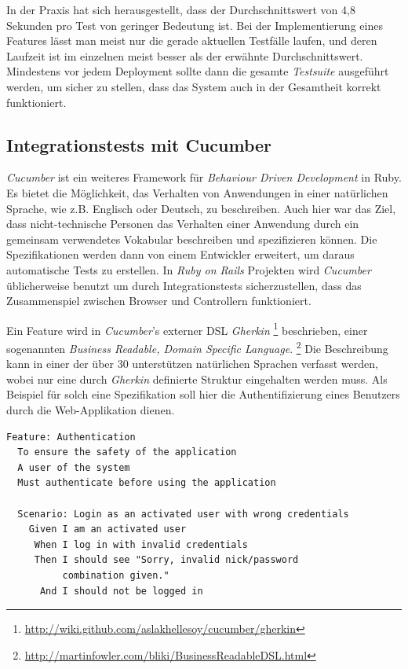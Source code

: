 In der Praxis hat sich herausgestellt, dass der Durchschnittswert von
4,8 Sekunden pro Test von geringer Bedeutung ist. Bei der
Implementierung eines Features lässt man meist nur die gerade
aktuellen Testfälle laufen, und deren Laufzeit ist im einzelnen meist
besser als der erwähnte Durchschnittswert. Mindestens vor jedem
Deployment sollte dann die gesamte \textit{Testsuite} ausgeführt werden, um
sicher zu stellen, dass das System auch in der Gesamtheit korrekt
funktioniert.

\subsection{Integrationstests mit Cucumber}
\textit{Cucumber} \cite{cucumber} ist ein weiteres Framework für
\textit{Behaviour Driven Development} in Ruby. Es bietet die
Möglichkeit, das Verhalten von Anwendungen in einer natürlichen
Sprache, wie z.B. Englisch oder Deutsch, zu beschreiben. Auch hier war
das Ziel, dass nicht-technische Personen das Verhalten einer Anwendung
durch ein gemeinsam verwendetes Vokabular beschreiben und
spezifizieren können. Die Spezifikationen werden dann von einem
Entwickler erweitert, um daraus automatische Tests zu erstellen. In
\textit{Ruby on Rails} Projekten wird \textit{Cucumber} üblicherweise benutzt
um durch Integrationstests sicherzustellen, dass das Zusammenspiel
zwischen Browser und Controllern funktioniert.

Ein Feature wird in \textit{Cucumber}'s externer DSL \textit{Gherkin}
\footnote{\url{http://wiki.github.com/aslakhellesoy/cucumber/gherkin}}
beschrieben, einer sogenannten \textit{Business Readable, Domain
  Specific Language}.
\footnote{\url{http://martinfowler.com/bliki/BusinessReadableDSL.html}}
Die Beschreibung kann in einer der über 30 unterstützen natürlichen
Sprachen verfasst werden, wobei nur eine durch \textit{Gherkin}
definierte Struktur eingehalten werden muss. Als Beispiel für solch
eine Spezifikation soll hier die Authentifizierung eines Benutzers
durch die Web-Applikation dienen.

\begin{lstlisting}[caption=Spezifikation eines Features mit \textit{Cucumber}]
Feature: Authentication
  To ensure the safety of the application
  A user of the system
  Must authenticate before using the application

  Scenario: Login as an activated user with wrong credentials
    Given I am an activated user
     When I log in with invalid credentials
     Then I should see "Sorry, invalid nick/password
          combination given."
      And I should not be logged in
\end{lstlisting}

